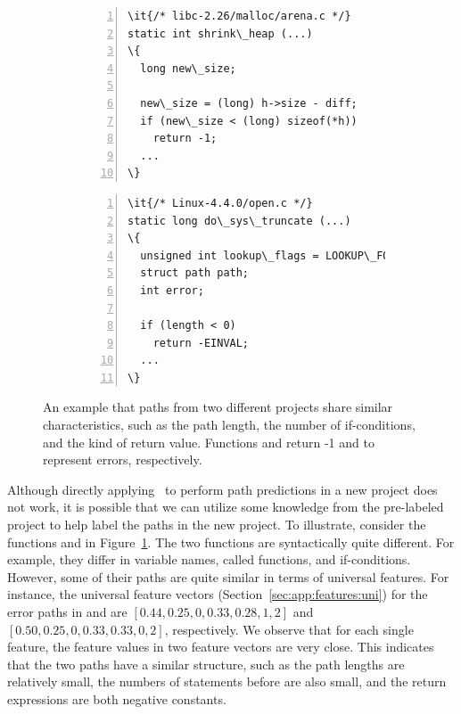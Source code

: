 \documentclass[12pt]{report}	%
\begin{document}
\begin{figure}[t]
\centering
\begin{subfigure}[b]{0.5\textwidth}
\begin{Verbatim}[numbers=left,xleftmargin=6mm,fontsize=\footnotesize,
    commandchars=\\\{\}]
\it{/* libc-2.26/malloc/arena.c */}
static int shrink\_heap (...)
\{
  long new\_size;

  new\_size = (long) h->size - diff; 
  if (new\_size < (long) sizeof(*h))
    return -1;
  ...
\}
\end{Verbatim}
\end{subfigure}%
\hfill
\begin{subfigure}[b]{0.5\textwidth}
\begin{Verbatim}[numbers=left,xleftmargin=6mm,fontsize=\footnotesize,
    commandchars=\\\{\}]
\it{/* Linux-4.4.0/open.c */}
static long do\_sys\_truncate (...)
\{
  unsigned int lookup\_flags = LOOKUP\_FOLLOW;
  struct path path;
  int error;

  if (length < 0)
    return -EINVAL;
  ...
\}
\end{Verbatim}
\end{subfigure}
\caption{An example that paths from two different projects share similar characteristics,
such as the path length, the number of if-conditions, and the kind of return value.
Functions  and 
return -1 and  to represent errors, respectively.
}
\label{fig:transfer}
\end{figure}

%
Although directly applying \sm\ to perform path predictions in a new
project does not work, 
it is possible that we can utilize some knowledge from 
the pre-labeled project to help label the paths in the new project.
%
To illustrate, consider the functions
 and 
in Figure~\ref{fig:transfer}. 
%
The two functions are 
syntactically quite different. For example, they differ
in variable names, called functions, and if-conditions.
However, some of their paths are quite similar in terms of 
universal features.
%
For instance,
the universal feature vectors (Section~\ref{sec:app:features:uni})
for the error paths in  and  are 
$[0.44, 0.25, 0, 0.33, 0.28, 1, 2]$ and
$[0.50, 0.25, 0, 0.33, 0.33, 0, 2]$,
respectively.
%
We observe that for each single feature, the feature values in
two feature vectors are very close. 
This indicates that the two paths have a similar structure,
such as the path lengths are relatively small,
the numbers of statements before  are also small,
and the return expressions are both negative constants. 
\end{document}

